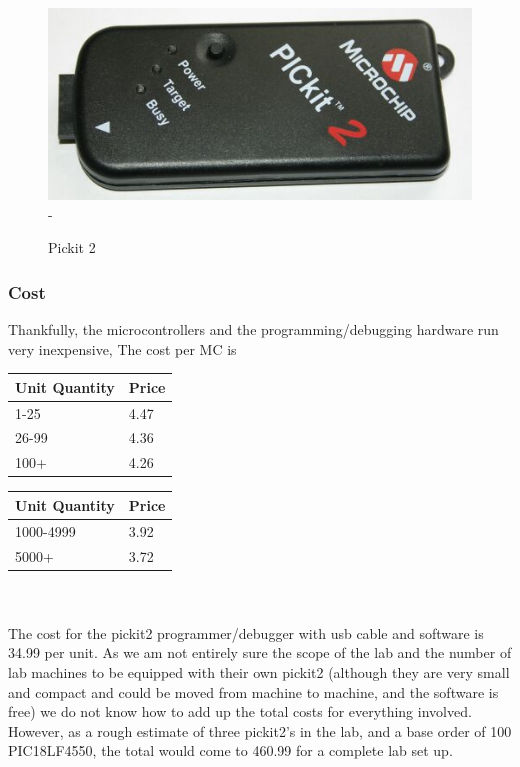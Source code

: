 \documentclass[12pt]{article}
\begin{document}
\begin{figure}[h]
  \centering
  \includegraphics[scale=.5]{images/pickit}
-  \caption{Pickit 2}
  \label{img:pic}
\end{figure}

\subsubsection{Cost}
Thankfully, the microcontrollers and the programming/debugging hardware run very inexpensive,
The cost per MC is \hfill \\

\begin{tabular}{ l | l }
  Unit Quantity & Price \\
  \hline
  1-25 & 4.47 \\
  26-99 & 4.36 \\
  100+ & 4.26 \\
\end{tabular} 

\begin{tabular}{l | l}
  Unit Quantity & Price \\
  \hline
  1000-4999 & 3.92 \\
  5000+ & 3.72 \\
\end{tabular}
\hfill \\\\

\noindent
The cost for the pickit2 programmer/debugger with usb cable and software is 34.99 per unit.
As we am not entirely sure the scope of the lab and the number of lab machines to be equipped with
their own pickit2 (although they are very small and compact and could be moved from machine
to machine, and the software is free) we do not know how to add up the total costs for everything
involved.
However, as a rough estimate of three pickit2's in the lab, and a base order of 100 PIC18LF4550,
the total would come to 460.99 for a complete lab set up.
\end{document}
